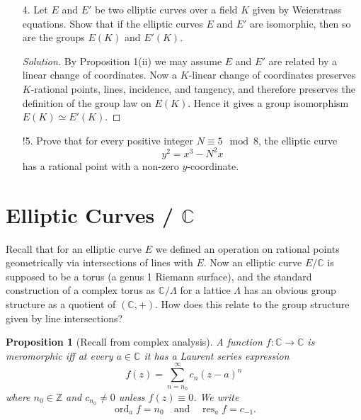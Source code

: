 \documentclass[a4paper]{article}
\theoremstyle{plain}
\newtheorem{proposition}[theorem]{Proposition}
\theoremstyle{remark}
\theoremstyle{definition}
\DeclareMathOperator{\ord}{ord}
\DeclareMathOperator{\res}{res}
\renewcommand{\O}{\mathcal{O}}
\newcommand{\F}{\mathbb{F}}
\newcommand{\Z}{\mathbb{Z}}
\newcommand{\C}{\mathbb{C}}
\begin{document}
\begin{enumerate}
\begin{proof}[Solution]
            For $E:y^2=x^3+x$ the points (apart from $\O$) are
            $\{(0,0),(2,1),(2,2)\}$. Since $(2,1)$ and $(2,2)$ do not have order
            2, having $y\ne0$, we have $E(\F_3)\simeq C_4$.
        \end{proof}

    \item[4.] Let $E$ and $E'$ be two elliptic curves over a field $K$ given by
        Weierstrass equations. Show that if the elliptic curves $E$ and $E'$ are
        isomorphic, then so are the groups $E(K)$ and $E'(K)$.

        \begin{proof}[Solution]
            By Proposition 1(ii) we may assume $E$ and $E'$ are related by a
            linear change of coordinates. Now a $K$-linear change of coordinates
            preserves $K$-rational points, lines, incidence, and tangency, and
            therefore preserves the definition of the group law on $E(K)$. Hence
            it gives a group isomorphism $E(K)\simeq E'(K)$.
        \end{proof}

    \item[!5.] Prove that for every positive integer $N\equiv5\mod8$, the
        elliptic curve
        \begin{equation*}
            y^2 = x^3-N^2x
        \end{equation*}
        has a rational point with a non-zero $y$-coordinate.
\end{enumerate}

\section{Elliptic Curves / $\C$}

Recall that for an elliptic curve $E$ we defined an operation on rational points
geometrically via intersections of lines with $E$. Now an elliptic curve $E/\C$
is supposed to be a torus (a genus 1 Riemann surface), and the standard
construction of a complex torus as $\C/\Lambda$ for a lattice $\Lambda$ has an
obvious group structure as a quotient of $(\C,+)$. How does this relate to the
group structure given by line intersections?

\begin{proposition}[Recall from complex analysis]
    A function $f:\C\to\C$ is meromorphic iff at
    every $a\in\C$ it has a Laurent series expression
    \begin{equation*}
        f(z) = \sum_{n=n_0}^\infty c_n(z-a)^n
    \end{equation*}
    where $n_0\in\Z$ and $c_{n_0}\ne0$ unless $f(z)\equiv0$. We write
    \begin{equation*}
        \ord_af = n_0 \quad \text{and} \quad \res_af=c_{-1}.
    \end{equation*}
\end{proposition}
\end{document}
